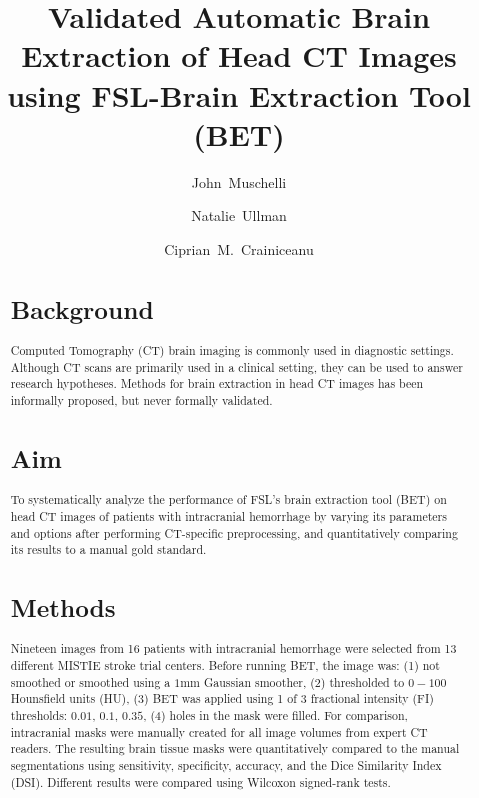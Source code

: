 \documentclass{elsarticle}\usepackage[]{graphicx}\usepackage[]{color}
\begin{document}
\renewcommand{\thesubfigure}{\Alph{subfigure}}

\begin{frontmatter}

\date{}

\title{Validated Automatic Brain Extraction of Head CT Images using FSL-Brain Extraction Tool (BET)}

\author[jhsph]{John~Muschelli}

\author[jhmi]{Natalie~Ullman}

\author[jhsph]{Ciprian~M.~Crainiceanu}

\address[jhsph]{Department of Biostatistics, Bloomberg School of Public Health, Johns Hopkins University, Baltimore, MD, USA}
\address[jhmi]{Department of Neurology, Division of Brain Injury Outcomes,  Johns Hopkins Medical Institutions, Baltimore, MD, USA}

\begin{abstract}
\section{Background}
Computed Tomography (CT) brain imaging is commonly used in diagnostic settings.  Although CT scans are primarily used in a clinical setting, they can be used to answer research hypotheses.  Methods for brain extraction in head CT images has been informally proposed, but never formally validated.


\section{Aim}

To systematically analyze the performance of FSL's brain extraction tool (BET) on head CT images of patients with intracranial hemorrhage by varying its parameters and options after performing CT-specific preprocessing, and quantitatively comparing its results to a manual gold standard.

\section{Methods}

Nineteen images from 16 patients with intracranial hemorrhage were selected from 13 different MISTIE stroke trial centers. Before running BET, the image was: (1) not smoothed or smoothed using a $1$mm Gaussian smoother, (2) thresholded to $0-100$ Hounsfield units (HU), (3) BET was applied using 1 of 3 fractional intensity (FI) thresholds: $0.01$, $0.1$, $0.35$, (4) holes in the mask were filled.
For comparison, intracranial masks were manually created for all image volumes from expert CT readers.  The resulting brain tissue masks were quantitatively compared to the manual segmentations using sensitivity, specificity, accuracy, and the Dice Similarity Index (DSI).  Different results were compared using Wilcoxon signed-rank tests.


\end{abstract}
\end{frontmatter}
\end{document}
